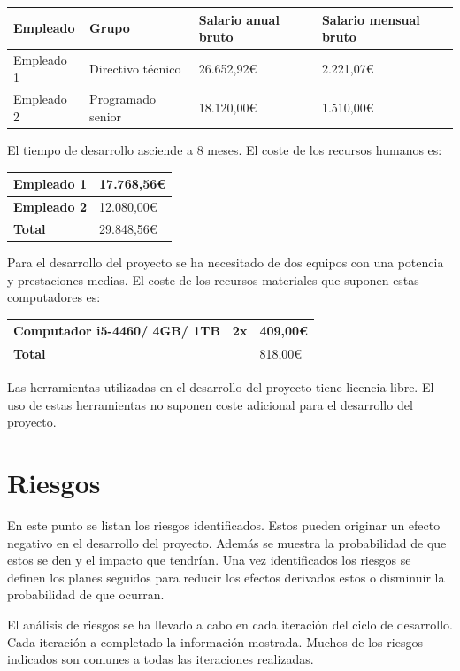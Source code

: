 \begin{tabular}{|l|l|l|l|} \hline
\textbf{Empleado} & \textbf{Grupo} & \textbf{Salario anual bruto} & \textbf{Salario mensual bruto}  \\ \hline
Empleado 1 & Directivo técnico & 26.652,92€ & 2.221,07€  \\ \hline
Empleado 2 & Programado senior & 18.120,00€ & 1.510,00€ \\ \hline
\end{tabular}

El tiempo de desarrollo asciende a 8 meses. El coste de los recursos humanos es:

\begin{tabular}{|l|l|} \hline
\textbf{Empleado 1} &  17.768,56€ \\ \hline
\textbf{Empleado 2} &  12.080,00€ \\ \hline
\textbf{Total} &  29.848,56€ \\ \hline
\end{tabular}
 
 Para el desarrollo del proyecto se ha necesitado de dos equipos con una potencia y prestaciones medias. El
 coste de los recursos materiales que suponen estas computadores es:
 
 \begin{tabular}{|l|l|l|} \hline
\textbf{Computador \tiny{i5-4460/ 4GB/ 1TB} } & 2x & 409,00€ \\ \hline
\textbf{Total} & & 818,00€ \\ \hline
\end{tabular}

Las herramientas utilizadas en el desarrollo del proyecto tiene licencia libre. El uso de estas herramientas no
suponen coste adicional para el desarrollo del proyecto. 

\section{Riesgos}

En este punto se listan los riesgos identificados. Estos pueden originar un efecto negativo en el 
desarrollo del proyecto. Además se muestra la probabilidad de que estos se den y el impacto que tendrían. 
Una vez identificados los riesgos se definen los planes seguidos para reducir los efectos derivados estos o disminuir
la probabilidad de que ocurran.

El análisis de riesgos se ha llevado a cabo en cada iteración del ciclo de desarrollo. Cada iteración a completado la 
información mostrada. Muchos de los riesgos indicados son comunes a todas las iteraciones realizadas. 

